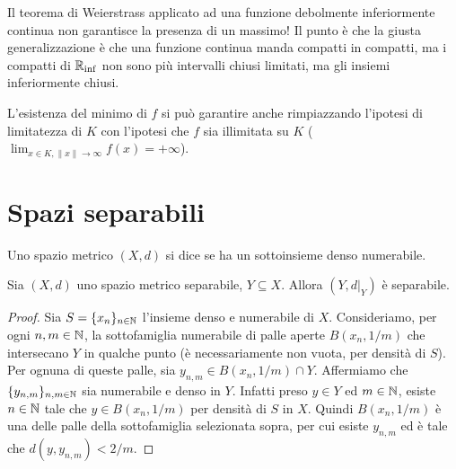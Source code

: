\begin{remark}
	Il teorema di Weierstrass applicato ad una funzione debolmente inferiormente continua non garantisce la presenza di un massimo! Il punto è che la giusta generalizzazione è che una funzione continua manda compatti in compatti, ma i compatti di $\mathbb{R}_{\inf}$ non sono più intervalli chiusi limitati, ma gli insiemi inferiormente chiusi.
\end{remark}

\begin{remark}
	L'esistenza del minimo di $f$ si può garantire anche rimpiazzando l'ipotesi di limitatezza di $K$ con l'ipotesi che $f$ sia illimitata su $K$ ($\lim_{x \in K, \|x\| \to \infty} f(x) = +\infty$).
\end{remark}

\section{Spazi separabili}
\begin{definition}
	Uno spazio metrico $(X, d)$ si dice  se ha un sottoinsieme denso numerabile.
\end{definition}

\begin{lemma}
	Sia $(X,d)$ uno spazio metrico separabile, $Y \subseteq X$.
	Allora $(Y, d\vert_Y)$ è separabile.
\end{lemma}
\begin{proof}
	Sia $S = \{x_n\}_{n \in \mathbb{N}}$ l'insieme denso e numerabile di $X$. Consideriamo, per ogni $n,m \in \mathbb{N}$, la sottofamiglia numerabile di palle aperte $B(x_n, 1/m)$ che intersecano $Y$ in qualche punto (è necessariamente non vuota, per densità di $S$). Per ognuna di queste palle, sia $y_{n,m} \in B(x_n, 1/m) \cap Y$. Affermiamo che $\{y_{n,m}\}_{n,m \in \mathbb{N}}$ sia numerabile e denso in $Y$. Infatti preso $y \in Y$ ed $m \in \mathbb{N}$, esiste $n \in \mathbb{N}$ tale che $y \in B(x_n, 1/m)$ per densità di $S$ in $X$. Quindi $B(x_n, 1/m)$ è una delle palle della sottofamiglia selezionata sopra, per cui esiste $y_{n,m}$ ed è tale che $d(y,y_{n,m}) < 2/m$.
\end{proof}

